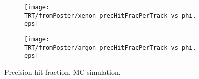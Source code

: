 \begin{figure}

\begin{subfigure}{.5\textwidth}
  \centering
  \texttt{[image: TRT/fromPoster/xenon\_precHitFracPerTrack\_vs\_phi.eps]}
\end{subfigure}%
\begin{subfigure}{.5\textwidth}
  \centering
  \texttt{[image: TRT/fromPoster/argon\_precHitFracPerTrack\_vs\_phi.eps]}
\end{subfigure}

\caption{Precision hit fraction. MC simulation.}
  \label{fig:precHitFracPerTrack}
\end{figure}

